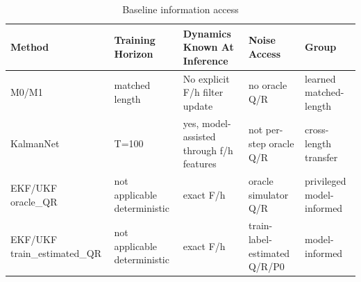 \begin{table}[t]
\centering
\caption{Baseline information access}
\label{tab:baseline_access}
\begin{tabular}{lllll}
\hline
Method & Training Horizon & Dynamics Known At Inference & Noise Access & Group \\
\hline
M0/M1 & matched length & No explicit F/h filter update & no oracle Q/R & learned matched-length \\
KalmanNet & T=100 & yes, model-assisted through f/h features & not per-step oracle Q/R & cross-length transfer \\
EKF/UKF oracle\_QR & not applicable deterministic & exact F/h & oracle simulator Q/R & privileged model-informed \\
EKF/UKF train\_estimated\_QR & not applicable deterministic & exact F/h & train-label-estimated Q/R/P0 & model-informed \\
\hline
\end{tabular}
\end{table}
